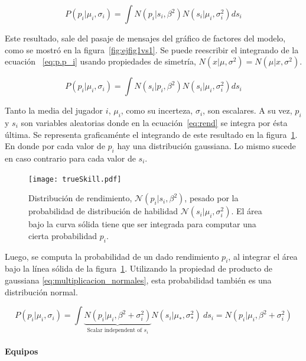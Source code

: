 \documentclass[11pt,twoside,spanish]{report} %
\newcommand{\N}{\mathcal{N}}
\begin{document}
\begin{equation}\label{eq:p.p_i}
P(p_i|\mu_i,\sigma_i) = \int N(p_i| s_i, \beta^2)N(s_i|\mu_i,\sigma_i^2) ds_i
\end{equation}

Este resultado, sale del pasaje de mensajes del gr\'afico de factores del modelo, como se mostr\'o en la figura~\ref{fig:ejfig1vs1}. 
Se puede reescribir el integrando de la ecuaci\'on ~\ref{eq:p.p_i} usando propiedades de simetr\'ia, $ N (x| \mu, \sigma^2) = N (\mu| x, \sigma^2)$.

\begin{equation}\label{eq:rend}
P(p_i|\mu_i,\sigma_i) = \int N(s_i| p_i, \beta^2)N(s_i|\mu_i,\sigma_i^2) ds_i
\end{equation}

Tanto la media del jugador $i$, $\mu_i$, como su incerteza, $\sigma_i$, son escalares.
A su vez, $p_i$ y $s_i$ son variables aleatorias donde en la ecuaci\'on~\ref{eq:rend} se integra por \'esta \'ultima.
Se representa graficam\'ente el integrando de este resultado en la figura~\ref{fig:fig8}.
En donde por cada valor de $p_i$ hay una distribuci\'on gaussiana.
Lo mismo sucede en caso contrario para cada valor de $s_i$.

\begin{figure}[H]
	\centering
	\texttt{[image: trueSkill.pdf]}
	\caption{Distribuci\'on de rendimiento, $\N(p_i|s_i,\beta^2)$, pesado por la probabilidad de distribuci\'on de habilidad $\N(s_i|\mu_i,\sigma_i^2)$. El \'area bajo la curva s\'olida tiene que ser integrada para computar una cierta probabilidad $p_i$.}
	\label{fig:fig8}
\end{figure}

Luego, se computa la probabilidad de un dado rendimiento $p_i$, al integrar el \'area bajo la l\'inea s\'olida de la figura~\ref{fig:fig8}.
Utilizando la propiedad de producto de gaussiana \ref{eq:multiplicacion_normales}, esta probabilidad tambi\'en es una distribuci\'on normal.

\begin{equation}
P(p_i|\mu_i,\sigma_i) = \int \underbrace{N(p_i|\mu_i,\beta^2 + \sigma_i^2)}_{\text{Scalar independent of $s_i$}} N(s_i|\mu_{*},\sigma_{*}^2)  \ ds_i  = N(p_i|\mu_i,\beta^2 + \sigma_i^2)
\end{equation}

\paragraph{Equipos}
\end{document}
